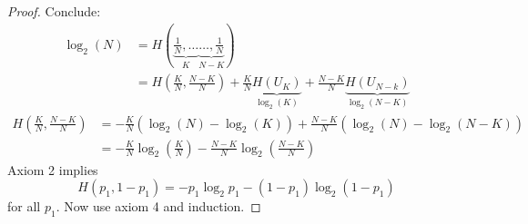 \documentclass[mfit.tex]{subfiles}
\begin{document}
\begin{proof}
  Conclude: 
  \begin{align*}
    \log_2(N) &= H\left(\underbrace{\frac{1}{N},\dots}_{K} \underbrace{\dots,\frac{1}{N}}_{N-K} \right) \\
    &= H\left(\frac{K}{N},\frac{N-K}{N} \right) + \frac{K}{N} \underbrace{H(U_K)}_{\log_2(K)} + \frac{N-K}{N} \underbrace{H(U_{N-k})}_{\log_2(N-K)}
  \end{align*}
  \begin{align*}
    H\left(\frac{K}{N},\frac{N-K}{N}\right) &= - \frac{K}{N} \left( \log_2(N) - \log_2(K) \right) 
    + \frac{N-K}{N} \left(\log_2(N) - \log_2(N-K) \right) \\
    &= - \frac{K}{N} \log_2\left(\frac{K}{N}\right) - \frac{N-K}{N} \log_2\left(\frac{N-K}{N}\right)
  \end{align*}
  Axiom 2 implies
  \[ H(p_1,1-p_1) = - p_1 \log_2 p_1 - (1-p_1) \log_2 (1-p_1) \]
  for all $p_1$.
  Now use axiom 4 and induction.
\end{proof}
\end{document}
